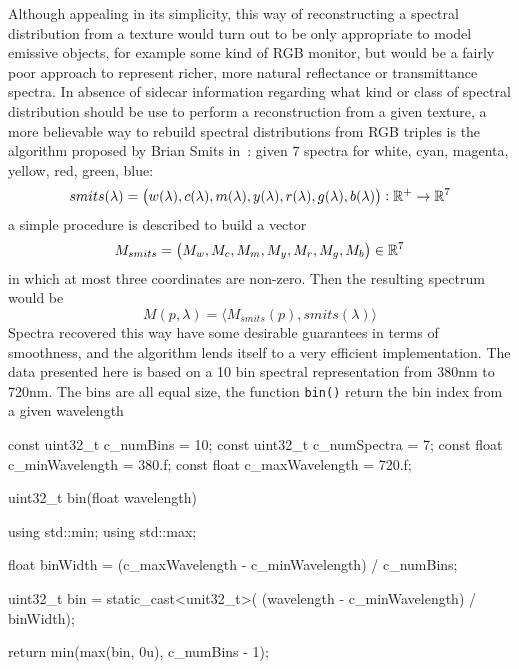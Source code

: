 Although appealing in its simplicity, this way of reconstructing a spectral
distribution from a texture would turn out to be only appropriate to model
emissive objects, for example some kind of \gls{RGB} monitor, but would be
a fairly poor approach to represent richer, more natural reflectance or
transmittance spectra.
In absence of sidecar information regarding what kind or class of spectral
distribution should be use to perform a reconstruction from a given texture,
a more believable way to rebuild spectral distributions from \gls{RGB} triples
is the algorithm proposed by Brian Smits in~\cite{smits99}: given $7$
spectra for white, cyan, magenta, yellow, red, green, blue:
\begin{displaymath}
smits(\lambda) = \big(w(\lambda), c(\lambda), m(\lambda), y(\lambda), r(\lambda), g(\lambda), b(\lambda)\big): \mathbb{R}^+\to\mathbb{R}^7
\end{displaymath}
a simple procedure is described to build a vector
\begin{displaymath}
M_{smits} = \big(M_w, M_c, M_m, M_y, M_r, M_g, M_b\big) \in \mathbb{R}^7
\end{displaymath}
in which at most three coordinates are non-zero.
Then the resulting spectrum would be
\begin{displaymath}
M(p,\lambda) = \big\langle M_{smits}(p), smits(\lambda) \big\rangle
\end{displaymath}
Spectra recovered this way have some desirable guarantees in terms of
smoothness, and the algorithm lends itself to a very efficient implementation.
The data presented here is based on a 10 bin spectral representation from
\num{380}\unit{\nano\meter} to \num{720}\unit{\nano\meter}. The bins are all equal size,
the function \Verb|bin()| return the bin index from a given wavelength


\begin{c++code}
const uint32_t c_numBins = 10;
const uint32_t c_numSpectra = 7;
const float    c_minWavelength = 380.f;
const float    c_maxWavelength = 720.f;

uint32_t bin(float wavelength)
{
    using std::min;
    using std::max;

    float binWidth = (c_maxWavelength - c_minWavelength) / c_numBins;

    uint32_t bin = static_cast<unit32_t>(
                        (wavelength - c_minWavelength) / binWidth);

    return min(max(bin, 0u), c_numBins - 1);
}
\end{c++code}


